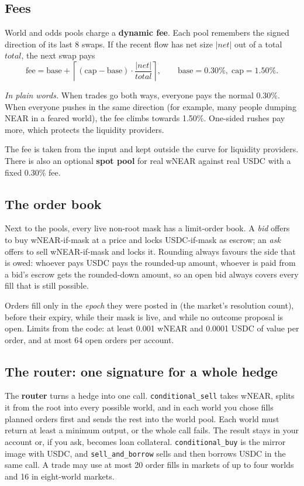 \documentclass[11pt,a4paper]{article}
\newcommand{\code}[1]{\texttt{\small #1}}
\newcommand{\inwords}[1]{\par\noindent\colorbox{note}{\parbox{\dimexpr\linewidth-2\fboxsep}{\small\textit{In plain words.} #1}}\par}
\begin{document}
\subsection{Fees}

World and odds pools charge a \textbf{dynamic fee}. Each pool remembers the signed direction of its last 8 swaps.
If the recent flow has net size $|\textit{net}|$ out of a total $\textit{total}$, the next swap pays
\begin{equation}
  \text{fee} = \text{base} + \left\lceil (\text{cap} - \text{base}) \cdot \frac{|\textit{net}|}{\textit{total}} \right\rceil,
  \qquad \text{base} = 0.30\%,\; \text{cap} = 1.50\%.
  \label{eq:fee}
\end{equation}
\inwords{When trades go both ways, everyone pays the normal 0.30\%. When everyone pushes in the same direction (for
example, many people dumping NEAR in a feared world), the fee climbs towards 1.50\%. One-sided rushes pay more,
which protects the liquidity providers.}
The fee is taken from the input and kept outside the curve for liquidity providers. There is also an optional
\textbf{spot pool} for real wNEAR against real USDC with a fixed 0.30\% fee.

\subsection{The order book}

Next to the pools, every live non-root mask has a limit-order book. A \emph{bid} offers to buy wNEAR-if-mask at a
price and locks USDC-if-mask as escrow; an \emph{ask} offers to sell wNEAR-if-mask and locks it. Rounding always
favours the side that is owed: whoever pays USDC pays the rounded-up amount, whoever is paid from a bid's escrow
gets the rounded-down amount, so an open bid always covers every fill that is still possible.

Orders fill only in the \emph{epoch} they were posted in (the market's resolution count), before their expiry,
while their mask is live, and while no outcome proposal is open. Limits from the code: at least 0.001 wNEAR and
0.0001 USDC of value per order, and at most 64 open orders per account.

\subsection{The router: one signature for a whole hedge}

The \textbf{router} turns a hedge into one call. \code{conditional\_sell} takes wNEAR, splits it from the root into
every possible world, and in each world you chose fills planned orders first and sends the rest into the world
pool. Each world must return at least a minimum output, or the whole call fails. The result stays in your account
or, if you ask, becomes loan collateral. \code{conditional\_buy} is the mirror image with USDC, and
\code{sell\_and\_borrow} sells and then borrows USDC in the same call. A trade may use at most 20 order fills in
markets of up to four worlds and 16 in eight-world markets.
\end{document}
